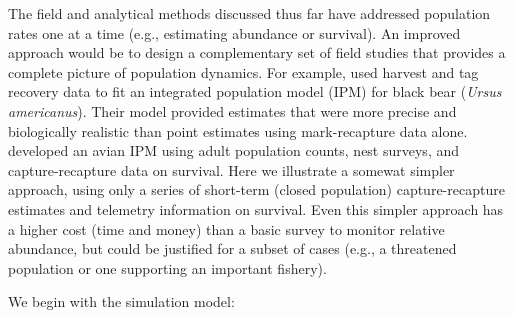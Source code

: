\documentclass[
]{krantz}
\begin{document}
The field and analytical methods discussed thus far have addressed population rates one at a time (e.g., estimating abundance or survival). An improved approach would be to design a complementary set of field studies that provides a complete picture of population dynamics. For example, \citet{conn.etal_2008} used harvest and tag recovery data to fit an integrated population model (IPM) for black bear (\emph{Ursus americanus}). Their model provided estimates that were more precise and biologically realistic than point estimates using mark-recapture data alone. \citet{kéry.schaub_2011} developed an avian IPM using adult population counts, nest surveys, and capture-recapture data on survival. Here we illustrate a somewat simpler approach, using only a series of short-term (closed population) capture-recapture estimates and telemetry information on survival. Even this simpler approach has a higher cost (time and money) than a basic survey to monitor relative abundance, but could be justified for a subset of cases (e.g., a threatened population or one supporting an important fishery).

We begin with the simulation model:
\end{document}
